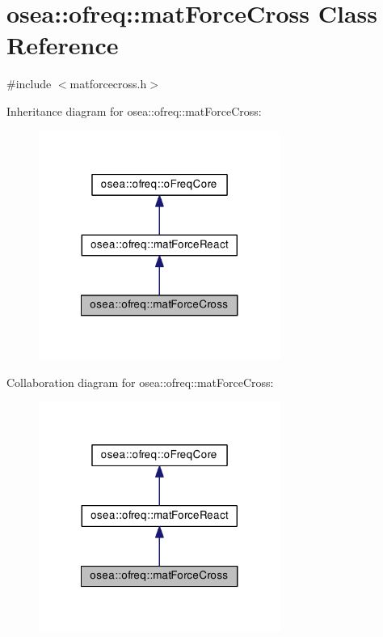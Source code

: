 \hypertarget{classosea_1_1ofreq_1_1mat_force_cross}{\section{osea\-:\-:ofreq\-:\-:mat\-Force\-Cross Class Reference}
\label{classosea_1_1ofreq_1_1mat_force_cross}
}


{\ttfamily \#include $<$matforcecross.\-h$>$}



Inheritance diagram for osea\-:\-:ofreq\-:\-:mat\-Force\-Cross\-:
\nopagebreak
\begin{figure}[H]
\begin{center}
\leavevmode
\includegraphics[width=224pt]{classosea_1_1ofreq_1_1mat_force_cross__inherit__graph}
\end{center}
\end{figure}


Collaboration diagram for osea\-:\-:ofreq\-:\-:mat\-Force\-Cross\-:
\nopagebreak
\begin{figure}[H]
\begin{center}
\leavevmode
\includegraphics[width=224pt]{classosea_1_1ofreq_1_1mat_force_cross__coll__graph}
\end{center}
\end{figure}
